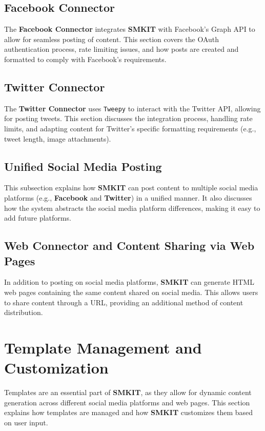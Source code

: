 \subsection{Facebook Connector}
\label{subsec:facebook_connector}
The \textbf{Facebook Connector} integrates \textbf{SMKIT} with Facebook’s Graph API to allow for seamless posting of content. This section covers the OAuth authentication process, rate limiting issues, and how posts are created and formatted to comply with Facebook's requirements.

\subsection{Twitter Connector}
\label{subsec:twitter_connector}
The \textbf{Twitter Connector} uses \texttt{Tweepy} to interact with the Twitter API, allowing for posting tweets. This section discusses the integration process, handling rate limits, and adapting content for Twitter's specific formatting requirements (e.g., tweet length, image attachments).

\subsection{Unified Social Media Posting}
\label{subsec:unified_social_media_posting}
This subsection explains how \textbf{SMKIT} can post content to multiple social media platforms (e.g., \textbf{Facebook} and \textbf{Twitter}) in a unified manner. It also discusses how the system abstracts the social media platform differences, making it easy to add future platforms.

\subsection{Web Connector and Content Sharing via Web Pages}
\label{subsec:web_connector_content_sharing}
In addition to posting on social media platforms, \textbf{SMKIT} can generate HTML web pages containing the same content shared on social media. This allows users to share content through a URL, providing an additional method of content distribution.

\section{Template Management and Customization}
\label{sec:template_management_and_customization}
Templates are an essential part of \textbf{SMKIT}, as they allow for dynamic content generation across different social media platforms and web pages. This section explains how templates are managed and how \textbf{SMKIT} customizes them based on user input.


